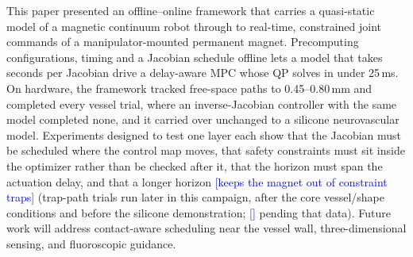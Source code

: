 \documentclass[journal]{IEEEtran}
\newcommand{\NEWRUN}[1]{\textcolor{blue}{[#1]}}
\begin{document}
This paper presented an offline--online framework that carries a
quasi-static model of a magnetic continuum robot through to real-time,
constrained joint commands of a manipulator-mounted permanent magnet.
Precomputing configurations, timing and a Jacobian schedule offline lets a
model that takes seconds per Jacobian drive a delay-aware MPC whose QP
solves in under 25\,ms. On
hardware, the framework tracked free-space paths to 0.45--0.80\,mm and
completed every vessel trial, where an inverse-Jacobian controller with the
same model completed none, and it carried over unchanged to a silicone
neurovascular model. Experiments designed to test one layer each show
that the Jacobian must be scheduled where the control map moves, that
safety constraints must sit inside the optimizer rather than be checked
after it, that the horizon must span the actuation delay, and that a
longer horizon \NEWRUN{keeps the magnet out of constraint traps}
(trap-path trials run later in this campaign, after the core vessel/shape
conditions and before the silicone demonstration; \NEWRUN{} pending that data). Future
work will address contact-aware scheduling near the vessel wall,
three-dimensional sensing, and fluoroscopic guidance.
\end{document}
